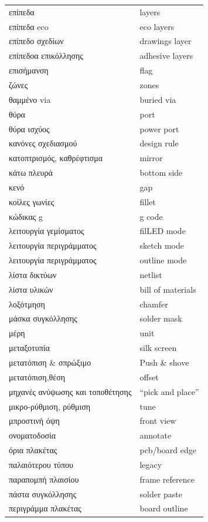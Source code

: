\documentclass[a4paper]{article}
\begin{document}
\begin{longtabu}{ l l }
    επίπεδα	&	layers	\\
    επίπεδα eco	&	eco layers	\\
    επίπεδο σχεδίων	&	drawings layer	\\
    επίπεδοα επικόλλησης	&	adhesive layers	\\
    επισήμανση	&	flag	\\
    ζώνες	&	zones	\\
    θαμμένο via	&	buried via	\\
    θύρα	&	port	\\
    θύρα ισχύος	&	power port	\\
    κανόνες σχεδιασμού	&	design rule	\\
    κατοπτρισμός, καθρέφτισμα	&	mirror	\\
    κάτω πλευρά	&	bottom side	\\
    κενό	&	gap	\\
    κοίλες γωνίες	&	fillet	\\
    κώδικας g	&	g code	\\
    λειτουργία γεμίσματος	&	fil\textenglish{LED} mode	\\
    λειτουργία περιγράμματος	&	sketch mode	\\
    λειτουργία περιγράμματος	&	outline mode	\\
    λίστα δικτύων	&	netlist	\\
    λίστα υλικών	&	bill of materials	\\
    λοξότμηση	&	chamfer	\\
    μάσκα συγκόλλησης	&	solder mask	\\
    μέρη	&	unit	\\
    μεταξοτυπία	&	silk screen	\\
    μετατόπιση \& σπρώξιμο	&	Push \& shove	\\
    μετατόπιση,θέση	&	offset	\\
    μηχανές ανύψωσης και τοποθέτησης	&	“pick and place”	\\
    μικρο-ρύθμιση, ρύθμιση	&	tune	\\
    μπροστινή όψη	&	front view	\\
    ονοματοδοσία	&	annotate	\\
    όρια πλακέτας	&	pcb/board edge	\\
    παλαιότερου τύπου	&	legacy	\\
    παραπομπή πλαισίου	&	frame reference	\\
    πάστα συγκόλλησης	&	solder paste	\\
    περιγράμμα πλακέτας	&	board outline	\\

\end{longtabu}
\end{document}
